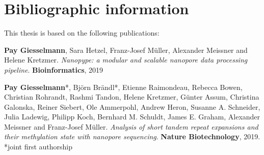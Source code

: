 \chapter*{Bibliographic information}
\label{sec:bib}
\vspace*{-10mm}


This thesis is based on the following publications:

\textbf{Pay Giesselmann}, Sara Hetzel, Franz-Josef Müller, Alexander Meissner and Helene Kretzmer. \textit{Nanopype: a modular and scalable nanopore data processing pipeline}. \textbf{Bioinformatics}, 2019


\textbf{Pay Giesselmann}*, Björn Brändl*, Etienne Raimondeau, Rebecca Bowen, Christian Rohrandt, Rashmi Tandon, Helene Kretzmer, Günter Assum, Christina Galonska, Reiner Siebert, Ole Ammerpohl, Andrew Heron, Susanne A. Schneider, Julia Ladewig, Philipp Koch, Bernhard M. Schuldt, James E. Graham, Alexander Meissner and Franz-Josef Müller. \textit{Analysis of short tandem repeat expansions and their methylation state with nanopore sequencing}. \textbf{Nature Biotechnology}, 2019. *joint first authorship






